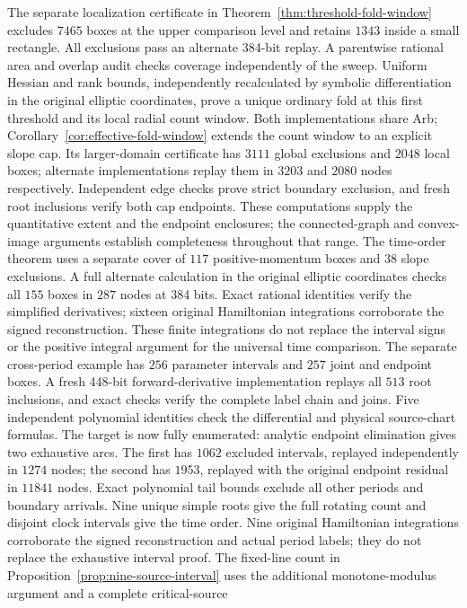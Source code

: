 \documentclass[11pt,a4paper]{article}
\theoremstyle{remark}\newtheorem{remark}[theorem]{Remark}
\begin{document}
The separate localization certificate in
Theorem~\ref{thm:threshold-fold-window} excludes $7465$ boxes at the upper
comparison level and retains $1343$ inside a small rectangle. All exclusions
pass an alternate 384-bit replay. A parentwise rational area and overlap
audit checks coverage independently of the sweep. Uniform Hessian and rank
bounds, independently recalculated by symbolic differentiation in the
original elliptic coordinates, prove a unique ordinary fold at this first
threshold and its local radial count window. Both implementations share Arb;
Corollary~\ref{cor:effective-fold-window} extends the count window to
an explicit slope cap. Its larger-domain certificate has $3111$ global
exclusions and $2048$ local boxes; alternate implementations replay them
in $3203$ and $2080$ nodes respectively. Independent edge checks prove
strict boundary exclusion, and fresh root inclusions verify both cap
endpoints. These computations supply the quantitative extent and the
endpoint enclosures; the connected-graph and convex-image arguments
establish completeness throughout that range. The time-order theorem
uses a separate cover of $117$ positive-momentum boxes and $38$ slope
exclusions. A full alternate calculation in the original elliptic
coordinates checks all $155$ boxes in $287$ nodes at 384 bits. Exact
rational identities verify the simplified derivatives; sixteen original
Hamiltonian integrations corroborate the signed reconstruction. These
finite integrations do not replace the interval signs or the positive
integral argument for the universal time comparison. The separate
cross-period example has $256$ parameter intervals and $257$ joint and
endpoint boxes. A fresh 448-bit forward-derivative implementation replays
all $513$ root inclusions, and exact checks verify the complete label chain
and joins. Five independent polynomial identities check the differential
and physical source-chart formulas. The target is now fully enumerated:
analytic endpoint elimination gives two exhaustive arcs. The first has
$1062$ excluded intervals, replayed independently in $1274$ nodes; the
second has $1953$, replayed with the original endpoint residual in
$11841$ nodes. Exact polynomial tail bounds exclude all other periods
and boundary arrivals. Nine unique simple roots give the full rotating
count and disjoint clock intervals give the time order. Nine original
Hamiltonian integrations corroborate the signed reconstruction and actual
period labels; they do not replace the exhaustive interval proof.
The fixed-line count in Proposition~\ref{prop:nine-source-interval}
uses the additional monotone-modulus argument and a complete critical-source
\end{document}

